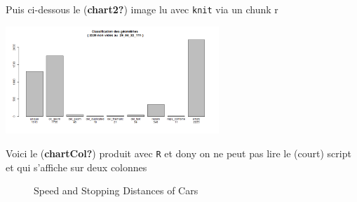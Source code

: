 \documentclass[
  12pt,
  a4paper,
]{scrbook}
\begin{document}
Puis ci-dessous le (\textbf{chart2?}) image lu avec \texttt{knit} via un
chunk r

\includegraphics[width=3.17in,height=\textheight]{./figures/bar_classify_Del_29_04_22_17h.png}

Voici le (\textbf{chartCol?}) produit avec \texttt{R} et dony on ne peut
pas lire le (court) script et qui s'affiche sur deux colonnes

\begin{figure}

\begin{minipage}[t]{0.50\linewidth}

{\centering 


\caption{Speed and Stopping Distances of Cars}

}

\end{minipage}%
%
\begin{minipage}[t]{0.50\linewidth}

{\centering 

\raisebox{-\height}{

}}
\end{minipage}
\end{figure}
\end{document}
